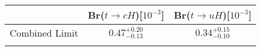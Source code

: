 \centering
\begin{tabular}{ccc} \toprule\toprule
 & Br($t\to cH$)[$10^{-3}$] & Br($t\to uH$)[$10^{-3}$]\\\midrule
Combined Limit & $0.47^{+0.20}_{-0.13}$ & $0.34^{+0.15}_{-0.10}$\\
\bottomrule\bottomrule\\
\end{tabular}